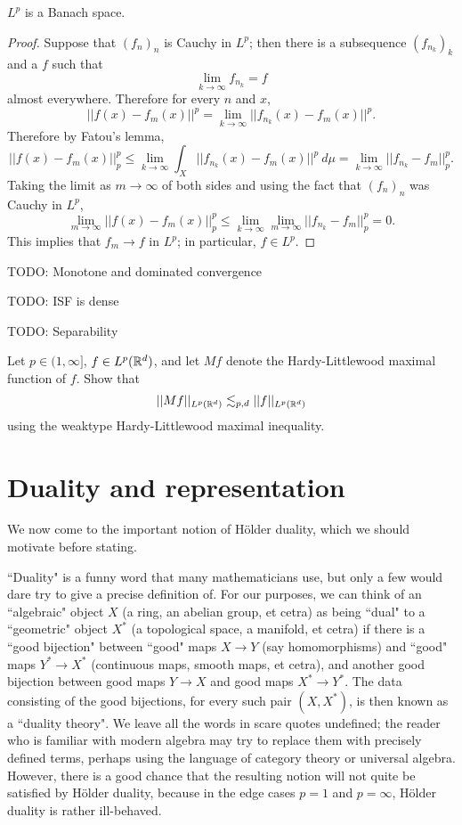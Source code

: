 \begin{theorem}
$L^p$ is a Banach space.
\end{theorem}
\begin{proof}
Suppose that $(f_n)_n$ is Cauchy in $L^p$; then there is a subsequence $(f_{n_k})_k$ and a $f$ such that
$$\lim_{k \to \infty} f_{n_k} = f$$
almost everywhere. Therefore for every $n$ and $x$,
$$||f(x) - f_m(x)||^p = \lim_{k \to \infty} ||f_{n_k}(x) - f_m(x)||^p.$$
Therefore by Fatou's lemma,
$$||f(x) - f_m(x)||_p^p \leq \lim_{k \to \infty} \int_X ||f_{n_k}(x) - f_m(x)||^p~d\mu = \lim_{k \to \infty} ||f_{n_k} - f_m||_p^p.$$
Taking the limit as $m \to \infty$ of both sides and using the fact that $(f_n)_n$ was Cauchy in $L^p$,
$$\lim_{m \to \infty} ||f(x) - f_m(x)||_p^p \leq \lim_{k \to \infty} \lim_{m \to \infty} ||f_{n_k} - f_m||_p^p = 0.$$
This implies that $f_m \to f$ in $L^p$; in particular, $f \in L^p$.
\end{proof}

TODO: Monotone and dominated convergence

TODO: ISF is dense

TODO: Separability

\begin{exercise}
Let $p \in (1, \infty]$, $f \in L^p(\mathbb{R}^d)$, and let $Mf$ denote the Hardy-Littlewood maximal function of $f$.
Show that
$$||Mf||_{L^p(\mathbb{R}^d)} \lesssim_{p,d} ||f||_{L^p(\mathbb{R}^d)}$$
using the weaktype Hardy-Littlewood maximal inequality.
\end{exercise}

\section{Duality and representation}
We now come to the important notion of H\"older duality, which we should motivate before stating.

``Duality" is a funny word that many mathematicians use, but only a few would dare try to give a precise definition of.
For our purposes, we can think of an ``algebraic" object $X$ (a ring, an abelian group, et cetra) as being ``dual" to a ``geometric" object $X^*$ (a topological space, a manifold, et cetra) if there is a ``good bijection" between ``good" maps $X \to Y$ (say homomorphisms) and ``good" maps $Y^* \to X^*$ (continuous maps, smooth maps, et cetra), and another good bijection between good maps $Y \to X$ and good maps $X^* \to Y^*$.
The data consisting of the good bijections, for every such pair $(X, X^*)$, is then known as a ``duality theory".
We leave all the words in scare quotes undefined; the reader who is familiar with modern algebra may try to replace them with precisely defined terms, perhaps using the language of category theory or universal algebra.
However, there is a good chance that the resulting notion will not quite be satisfied by H\"older duality, because in the edge cases $p = 1$ and $p = \infty$, H\"older duality is rather ill-behaved.

